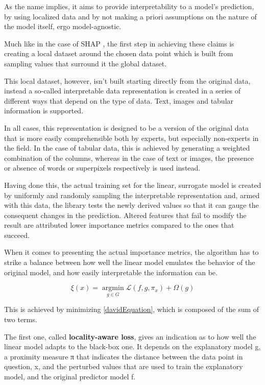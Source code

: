 As the name implies, it aims to provide interpretability to a model’s prediction, by using localized data and by not making a priori assumptions on the nature of the model itself, ergo model-agnostic. 

Much like in the case of SHAP , the first step in achieving these claims is creating a local dataset around the chosen data point which is built from sampling values that surround it the global dataset. 

This local dataset, however, isn’t built starting directly from the original data, instead a so-called interpretable data representation is created in a series of different ways that depend on the type of data. Text, images and tabular information is supported. 

In all cases, this representation is designed to be a version of the original data that is more easily comprehensible both by experts, but especially non-experts in the field. In the case of tabular data, this is achieved by generating a weighted combination of the columns, whereas in the case of text or images, the presence or absence of words or superpixels respectively is used instead.

Having done this, the actual training set for the linear, surrogate model is created by uniformly and randomly sampling the interpretable representation and, armed with this data, the library tests the newly derived values so that it can gauge the consequent changes in the prediction. Altered features that fail to modify the result are attributed lower importance metrics compared to the ones that succeed. 

When it comes to presenting the actual importance metrics, the algorithm has to strike a balance between how well the linear model emulates the behavior of the original model, and how easily interpretable the information can be. 

\begin{equation} 
  \xi(x)=\underset{g \in G}{\operatorname{argmin}} \mathcal{L}\left(f, g, \pi_{x}\right)+\Omega(g)
    \label{davidEquation}
\end{equation}

This is achieved by minimizing \eqref{davidEquation}, which is composed of the sum of two terms. 

The first one, called \textbf{locality-aware loss}, gives an indication as to how well the linear model adapts to the black-box one. It depends on the explanatory model g, a proximity measure π that indicates the distance between the data point in question, x, and the perturbed values that are used to train the explanatory model, and the original predictor model f. 

